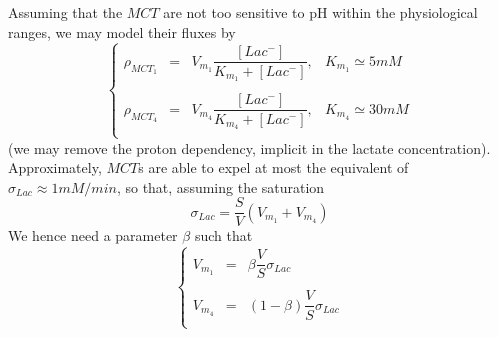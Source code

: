 \documentclass{revtex4}
\begin{document}
\begin{itemize}
Assuming that the $MCT$ are not too sensitive to pH within the physiological ranges, we may model their fluxes by
\begin{equation}
	\left\lbrace
	\begin{array}{rcll}
	\rho_{MCT_1} & = & V_{m_1} \dfrac{\left[Lac^-\right]}{K_{m_1}+\left[Lac^-\right]}, & K_{m_1}\simeq 5mM\\
	\\
	\rho_{MCT_4} & = & V_{m_4} \dfrac{\left[Lac^-\right]}{K_{m_4}+\left[Lac^-\right]}, & K_{m_4}\simeq 30mM\\
	\end{array}
	\right.
\end{equation}
(we may remove the proton dependency, implicit in the lactate concentration).
Approximately, $MCT$s are able to expel at most the equivalent of $\sigma_{Lac}\approx 1mM/min$, so that, assuming the saturation
\begin{equation}
\sigma_{Lac} = \dfrac{S}{V}\left( V_{m_1} + V_{m_4} \right)
\end{equation}
We hence need a parameter $\beta$ such that
\begin{equation}
	\left\lbrace
	\begin{array}{rcr}
	V_{m_1} & = & \beta \dfrac{V}{S} \sigma_{Lac} \\
	\\
	V_{m_4} & = & (1-\beta) \dfrac{V}{S} \sigma_{Lac} \\
	\end{array}
	\right.
\end{equation}


\end{itemize}
\end{document}
